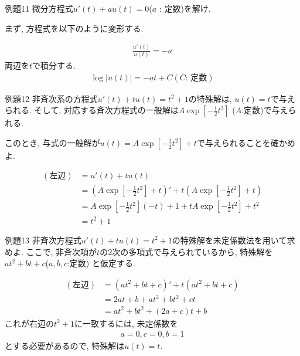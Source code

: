 \documentclass[a4paper,12pt]{jlreq}
\begin{document}
\vspace{20mm}

\begin{itembox}[l]{例題11}
微分方程式$u'(t) + au(t) = 0$($a$ : 定数)を解け.

\end{itembox}

\par
まず, 方程式を以下のように変形する.

\begin{align*}
    \frac{u'(t)}{u(t)} = -a
\end{align*}
両辺を$t$で積分する.
\begin{align*}
    \log\left|u(t)\right| = -at + C(C \text{: 定数})
\end{align*}




\begin{itembox}[l]{例題12}
非斉次系の方程式$u'(t) + tu(t) = t^2 + 1$の特殊解は, $u(t) = t$で与えられる. そして, 対応する斉次方程式の一般解は$A\exp[-\frac{1}{2}t^2]$ ($A$:定数)で与えられる. \par
このとき, 与式の一般解が$u(t) = A\exp[-\frac{1}{2}t^2] + t$で与えられることを確かめよ.

\end{itembox}

\par
\begin{align*}
    (\text{左辺}) &= u'(t) + tu(t)\\
                 &= (A\exp[-\frac{1}{2}t^2] + t)' + t(A\exp[-\frac{1}{2}t^2] + t)\\
                 &= A\exp[-\frac{1}{2}t^2](-t) + 1 + tA\exp[-\frac{1}{2}t^2] + t^2\\
                 &= t^2 + 1
\end{align*}




\begin{itembox}[l]{例題13}
非斉次方程式$u'(t) + tu(t) = t^2 +1$の特殊解を未定係数法を用いて求めよ. 
ここで, 非斉次項が$t$の2次の多項式で与えられているから, 特殊解を$at^2 + bt + c$($a,b,c$:定数)
と仮定する.
\end{itembox}

\par
\begin{align*}
    (左辺) &= (at^2 + bt + c)' + t(at^2 + bt + c)\\
          &= 2at + b + at^3 + bt^2 + ct\\
          &= at^2 + bt^2 + (2a+c)t + b
\end{align*}
これが右辺の$t^2+1$に一致するには, 未定係数を
\begin{align*}
    a=0,　c=0,　b=1
\end{align*}
とする必要があるので, 特殊解は$u(t)=t$.
\end{document}
